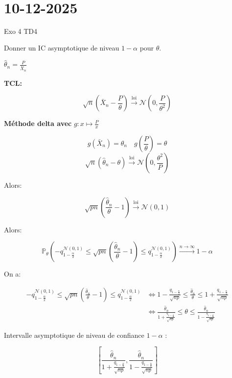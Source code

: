 \chapter{10-12-2025}

\exo
\begin{enonce}
Exo 4 TD4


\ques Donner un IC asymptotique de niveau $1- \alpha$ pour $\theta$.
\end{enonce}
\begin{correction}
\ques $\hat{\theta}_n = \frac{P}{\bar{X}_n}$

\textbf{TCL:}

\[
\sqrt{n}\left(\bar{X}_n - \frac{P}{\theta}\right) \xrightarrow{\text{loi}} \mathcal{N}\left(0, \frac{P}{\theta^2}\right)
\]

\textbf{Méthode delta avec } $g : x \mapsto \frac{P}{x}$

\[
g(\bar{X}_n) = \hat{\theta}_n \quad g\left(\frac{P}{\theta}\right) = \theta
\]
\[
\sqrt{n}\left(\hat{\theta}_n - \theta\right) \xrightarrow{\text{loi}} \mathcal{N}\left(0, \frac{\theta^2}{P}\right)
\]

Alors:

\[
\sqrt{pn}\left(\frac{\hat{\theta}_n}{\theta} - 1\right) \xrightarrow{\text{loi}} \mathcal{N}(0, 1)
\]

Alors:

\[
\mathbb{P}_\theta\left(-q^{\mathcal{N}(0,1)}_{1-\frac{\alpha}{2}} \leq \sqrt{pn}\left(\frac{\hat{\theta}_n}{\theta} - 1\right) \leq q^{\mathcal{N}(0,1)}_{1-\frac{\alpha}{2}}\right) \xrightarrow{n \to \infty} 1 - \alpha
\]

On a:

\begin{align*}
-q^{\mathcal{N}(0,1)}_{1-\frac{\alpha}{2}} \leq \sqrt{pn}\left(\frac{\hat{\theta}_n}{\theta} - 1\right) \leq q^{\mathcal{N}(0,1)}_{1-\frac{\alpha}{2}}
& \Leftrightarrow 1 - \frac{q_{1-\frac{\alpha}{2}}}{\sqrt{np}} \leq \frac{\hat{\theta}_n}{\theta} \leq 1 + \frac{q_{1-\frac{\alpha}{2}}}{\sqrt{np}} \\
& \Leftrightarrow \frac{\hat{\theta}_n}{1 + \frac{q_{1-\frac{\alpha}{2}}}{\sqrt{np}}} \leq \theta \leq \frac{\hat{\theta}_n}{1 - \frac{q_{1-\frac{\alpha}{2}}}{\sqrt{np}}}
\end{align*}

Intervalle asymptotique de niveau de confiance $1 - \alpha$ :

\[
\left[\frac{\hat{\theta}_n}{1 + \frac{q_{1-\frac{\alpha}{2}}}{\sqrt{np}}}, \frac{\hat{\theta}_n}{1 - \frac{q_{1-\frac{\alpha}{2}}}{\sqrt{np}}}\right]
\]


\end{correction}
